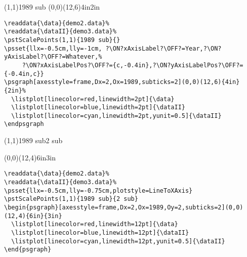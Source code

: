 \documentclass[11pt,english,BCOR10mm,DIV12,bibliography=totoc,parskip=false,smallheadings
    headexclude,footexclude,oneside,dvipsnames,svgnames]{pst-doc}
\begin{document}
\begin{center}
%
%
\pstScalePoints(1,1){1989 sub}{}
\psgraph[axesstyle=frame,Dx=2,Ox=1989,subticks=2](0,0)(12,6){4in}{2in}%
  \listplot[linecolor=red,linewidth=2pt]{\data}
  \listplot[linecolor=blue,linewidth=2pt]{\dataII}
  \listplot[linecolor=cyan,linewidth=2pt,yunit=0.5]{\dataII}
\endpsgraph
\end{center}

\begin{lstlisting}
\readdata{\data}{demo2.data}%
\readdata{\dataII}{demo3.data}%
\pstScalePoints(1,1){1989 sub}{}
\psset{llx=-0.5cm,lly=-1cm, ?\ON?xAxisLabel?\OFF?=Year,?\ON?yAxisLabel?\OFF?=Whatever,%
     ?\ON?xAxisLabelPos?\OFF?={c,-0.4in},?\ON?yAxisLabelPos?\OFF?={-0.4in,c}}
\psgraph[axesstyle=frame,Dx=2,Ox=1989,subticks=2](0,0)(12,6){4in}{2in}%
  \listplot[linecolor=red,linewidth=2pt]{\data}
  \listplot[linecolor=blue,linewidth=2pt]{\dataII}
  \listplot[linecolor=cyan,linewidth=2pt,yunit=0.5]{\dataII}
\endpsgraph
\end{lstlisting}

\begin{center}
%
%
\pstScalePoints(1,1){1989 sub}{2 sub}
\begin{psgraph}[axesstyle=frame,Dx=2,Ox=1989,Oy=2,subticks=2](0,0)(12,4){6in}{3in}
  \listplot[linecolor=red,linewidth=12pt]{\data}
  \listplot[linecolor=blue,linewidth=12pt]{\dataII}
  \listplot[linecolor=cyan,linewidth=12pt,yunit=0.5]{\dataII}
\end{psgraph}
\end{center}

\begin{lstlisting}
\readdata{\data}{demo2.data}%
\readdata{\dataII}{demo3.data}%
\psset{llx=-0.5cm,lly=-0.75cm,plotstyle=LineToXAxis}
\pstScalePoints(1,1){1989 sub}{2 sub}
\begin{psgraph}[axesstyle=frame,Dx=2,Ox=1989,Oy=2,subticks=2](0,0)(12,4){6in}{3in}
  \listplot[linecolor=red,linewidth=12pt]{\data}
  \listplot[linecolor=blue,linewidth=12pt]{\dataII}
  \listplot[linecolor=cyan,linewidth=12pt,yunit=0.5]{\dataII}
\end{psgraph}
\end{lstlisting}
\end{document}
